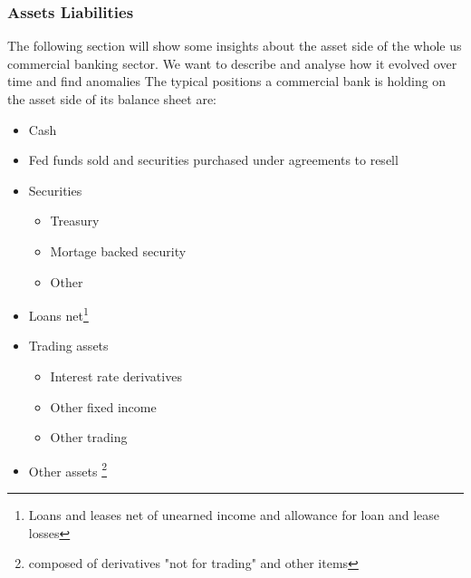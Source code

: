 \documentclass[12pt, a4paper]{article} %
\begin{document}
\subsubsection{Assets Liabilities}

The following section will show some insights about the asset side of the whole us commercial banking sector. We want to describe and analyse how it evolved over time and find anomalies 
The typical positions a commercial bank is holding on the asset side of its balance sheet are:

\begin{itemize}
 \item Cash
 \item Fed funds sold and securities purchased under agreements to resell
 \item Securities
  	\begin{itemize}
 	\item Treasury
 	\item Mortage backed security
 	\item Other
 	\end{itemize}
 \item Loans net\footnote{Loans and leases net of unearned income and allowance for loan and lease losses}
 \item Trading assets
 	\begin{itemize}
 	\item Interest rate derivatives
 	\item Other fixed income
 	\item Other trading
 	\end{itemize}
 \item Other assets \footnote{composed of derivatives "not for trading" and other items}
 \end{itemize} 
 
\end{document}
